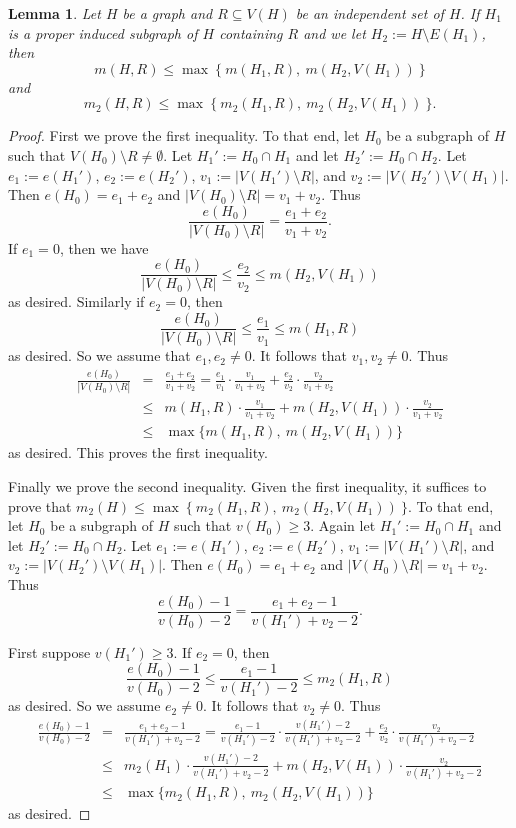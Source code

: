 \documentclass[11pt]{article}
\numberwithin{equation}{section}
\newcounter{i}
\theoremstyle{plain}
\newtheorem{lem}[thm]{Lemma}
\theoremstyle{plain} %
\theoremstyle{definition}
\begin{document}
\begin{lem}\label{lem:2DensityConcatenate}
Let $H$ be a graph and $R\subseteq V(H)$ be an independent set of $H$. If $H_1$ is a proper induced subgraph of $H$ containing $R$ and we let $H_2:= H\setminus E(H_1)$, then 
$$m(H,R) \le \max~\big\{~m(H_1,R),~m(H_2,V(H_1))~\big\}$$
and
$$m_2(H,R) \le \max~\big\{~m_2(H_1,R),~m_2(H_2,V(H_1))~\big\}.$$
\end{lem}
\begin{proof}
First we prove the first inequality. To that end, let $H_0$ be a subgraph of $H$ such that $V(H_0)\setminus R\ne \emptyset$. Let $H_1' := H_0\cap H_1$ and let $H_2':= H_0 \cap H_2$. Let $e_1 :=e(H_1')$, $e_2:=e(H_2')$, $v_1 := |V(H_1')\setminus R|$, and $v_2 := |V(H_2')\setminus V(H_1)|$. Then $e(H_0)=e_1+e_2$ and $|V(H_0)\setminus R| = v_1+v_2$. 
Thus
$$\frac{e(H_0)}{|V(H_0)\setminus R|} = \frac{e_1+e_2}{v_1+v_2}.$$
If $e_1=0$, then we have 
$$\frac{e(H_0)}{|V(H_0)\setminus R|} \le \frac{e_2}{v_2} \le m(H_2,V(H_1))$$
as desired. Similarly if $e_2=0$, then 
$$\frac{e(H_0)}{|V(H_0)\setminus R|} \le \frac{e_1}{v_1} \le m(H_1,R)$$
as desired. So we assume that $e_1,e_2\ne 0$. It follows that $v_1,v_2\ne 0$. Thus
{\small
\begin{eqnarray*}
\frac{e(H_0)}{|V(H_0)\setminus R|} &=& \frac{e_1+e_2}{v_1+v_2} = \frac{e_1}{v_1}\cdot \frac{v_1}{v_1+v_2} + \frac{e_2}{v_2}\cdot\frac{v_2}{v_1+v_2}\\ &\le& m(H_1,R) \cdot \frac{v_1}{v_1+v_2} + m(H_2,V(H_1))\cdot \frac{v_2}{v_1+v_2}\\ &\le& \max \{m(H_1,R),~m(H_2,V(H_1))\}
\end{eqnarray*}}
as desired. This proves the first inequality.

Finally we prove the second inequality. Given the first inequality, it suffices to prove that $m_2(H)\le \max~\big\{~m_2(H_1,R),~m_2(H_2,V(H_1))~\big\}$. To that end, let $H_0$ be a subgraph of $H$ such that $v(H_0)\ge 3$. Again let $H_1' := H_0\cap H_1$ and let $H_2':= H_0\cap H_2$. Let $e_1 :=e(H_1')$, $e_2:=e(H_2')$, $v_1 := |V(H_1')\setminus R|$, and $v_2 := |V(H_2')\setminus V(H_1)|$. Then $e(H_0)=e_1+e_2$ and $|V(H_0)\setminus R| = v_1+v_2$.
Thus
$$\frac{e(H_0)-1}{v(H_0)-2} = \frac{e_1+e_2-1}{v(H_1')+v_2-2}.$$


First suppose $v(H_1')\ge 3$. If $e_2=0$, then 
$$\frac{e(H_0)-1}{v(H_0)-2} \le \frac{e_1-1}{v(H_1')-2} \le m_2(H_1,R)$$
as desired. So we assume $e_2\ne 0$. It follows that $v_2\ne 0$. 
Thus
{\small
\begin{eqnarray*}
\frac{e(H_0)-1}{v(H_0)-2} &=& \frac{e_1+e_2-1}{v(H_1')+v_2-2} = \frac{e_1-1}{v(H_1')-2}\cdot \frac{v(H_1')-2}{v(H_1')+v_2-2} + \frac{e_2}{v_2}\cdot\frac{v_2}{v(H_1')+v_2-2}\\ &\le& m_2(H_1) \cdot \frac{v(H_1') - 2}{v(H_1')+v_2-2} + m(H_2,V(H_1))\cdot \frac{v_2}{v(H_1')+v_2-2}\\ &\le& \max \{m_2(H_1,R),~m_2(H_2,V(H_1))\}
\end{eqnarray*}}
as desired.


\end{proof}
\end{document}
